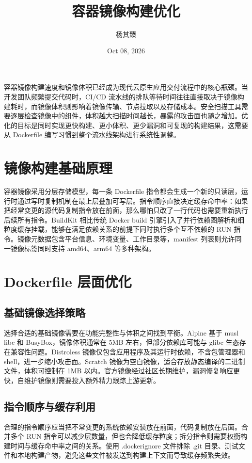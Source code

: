 \title{容器镜像构建优化}
\author{杨其臻}
\date{Oct 08, 2026}
\maketitle
容器镜像构建速度和镜像体积已经成为现代云原生应用交付流程中的核心瓶颈。当开发团队频繁提交代码时，CI/CD 流水线的排队等待时间往往直接取决于镜像构建耗时，而镜像体积则影响着镜像传输、节点拉取以及存储成本。安全扫描工具需要逐层检查镜像中的组件，体积越大扫描时间越长，暴露的攻击面也随之增加。优化的目标是同时实现更快构建、更小体积、更少漏洞和可复现的构建结果，这需要从 Dockerfile 编写习惯到整个流水线架构进行系统性调整。\par
\chapter{镜像构建基础原理}
容器镜像采用分层存储模型，每一条 Dockerfile 指令都会生成一个新的只读层，运行时通过写时复制机制在最上层叠加可写层。指令顺序直接决定缓存命中率：如果把经常变更的源代码复制指令放在前面，那么哪怕只改了一行代码也需要重新执行后续所有指令。BuildKit 相比传统 Docker build 引擎引入了并行依赖图解析和细粒度缓存挂载，能够在满足依赖关系的前提下同时执行多个互不依赖的 RUN 指令。镜像元数据包含平台信息、环境变量、工作目录等，manifest 列表则允许同一镜像标签同时支持 amd64、arm64 等多种架构。\par
\chapter{Dockerfile 层面优化}
\section{基础镜像选择策略}
选择合适的基础镜像需要在功能完整性与体积之间找到平衡。Alpine 基于 musl libc 和 BusyBox，镜像体积通常在 5MB 左右，但部分依赖库可能与 glibc 生态存在兼容性问题。Distroless 镜像仅包含应用程序及其运行时依赖，不含包管理器和 shell，进一步缩小攻击面。Scratch 镜像为空白镜像，适合存放静态编译的二进制文件，体积可控制在 1MB 以内。官方镜像经过社区长期维护，漏洞修复响应更快，自维护镜像则需要投入额外精力跟踪上游更新。\par
\section{指令顺序与缓存利用}
合理的指令顺序应当把不常变更的系统依赖安装放在前面，代码复制放在后面。合并多个 RUN 指令可以减少层数量，但也会降低缓存粒度；拆分指令则需要权衡构建时间与缓存命中率之间的关系。使用 .dockerignore 文件排除 .git 目录、测试文件和本地构建产物，避免这些文件被发送到构建上下文而导致缓存频繁失效。\par
